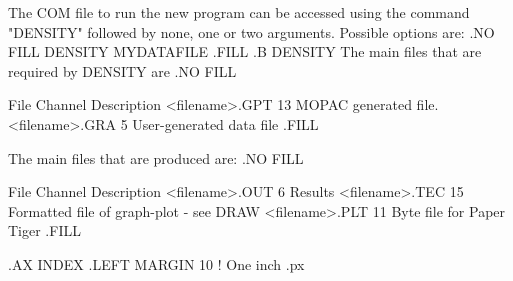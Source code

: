 The COM file to run the new program can be accessed using the command
"DENSITY" followed by none, one or two arguments.  Possible options are:
.NO FILL
DENSITY   MYDATAFILE 
.FILL
.B
DENSITY
The main files that are required by DENSITY are
.NO FILL
                                                  
           File          Channel     Description
         <filename>.GPT    13    MOPAC generated file.
         <filename>.GRA     5    User-generated data file
.FILL

The main files that are produced are:
.NO FILL
                   
           File          Channel     Description
        <filename>.OUT      6    Results
        <filename>.TEC     15    Formatted file of graph-plot - see DRAW
        <filename>.PLT     11    Byte file for Paper Tiger
.FILL

.AX INDEX
.LEFT MARGIN 10                 ! One inch
.px

